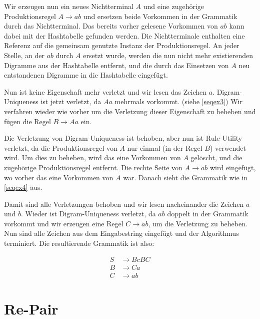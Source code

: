 Wir erzeugen nun ein neues Nichtterminal $A$ und eine zugehörige Produktionsregel $A \rightarrow ab$  und ersetzen beide Vorkommen in der Grammatik durch das Nichtterminal. Das bereits vorher gelesene Vorkommen von $ab$ kann dabei mit der Hashtabelle gefunden werden. 
Die Nichtterminale enthalten eine Referenz auf die gemeinsam genutzte Instanz der Produktionsregel. 
An jeder Stelle, an der $ab$ durch $A$ ersetzt wurde, werden die nun nicht mehr existierenden Digramme aus der Hashtabelle entfernt, und die durch das Einsetzen von $A$ neu entstandenen Digramme in die Hashtabelle eingefügt.

Nun ist keine Eigenschaft mehr verletzt und wir lesen das Zeichen $a$. Digram-Uniqueness ist jetzt verletzt, da $Aa$ mehrmals vorkommt. (siehe \autoref{seqex3})
Wir verfahren wieder wie vorher um die Verletzung dieser Eigenschaft zu beheben und fügen die Regel $B \rightarrow Aa$ ein.

Die Verletzung von Digram-Uniqueness ist behoben, aber nun ist Rule-Utility verletzt, da die Produktionsregel von $A$ nur einmal (in der Regel $B$) verwendet wird.
Um dies zu beheben, wird das eine Vorkommen von $A$ gelöscht, und die zugehörige Produktionsregel entfernt. Die rechte Seite von $A \rightarrow ab$ wird eingefügt, wo vorher das eine Vorkommen von $A$ war. Danach sieht die Grammatik wie in \autoref{seqex4} aus.

Damit sind alle Verletzungen behoben und wir lesen nacheinander die Zeichen $a$ und $b$.
Wieder ist Digram-Uniqueness verletzt, da $ab$ doppelt in der Grammatik vorkommt und wir erzeugen eine Regel $C \rightarrow ab$, um die Verletzung zu beheben. Nun sind alle Zeichen aus dem Eingabestring eingefügt und der Algorithmus terminiert. Die resultierende Grammatik ist also:

\begin{align*}
	S &\rightarrow BcBC\\
	B &\rightarrow Ca\\
	C &\rightarrow ab
\end{align*}



\section{Re-Pair}
\label{repair}

